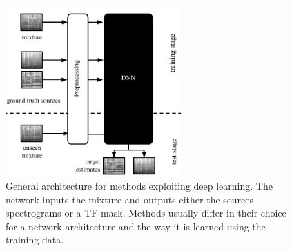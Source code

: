 {{\begin{figure}
  \centering
  \includegraphics[width=0.6\textwidth]{Chapters/06_Separation_Unknown/figures/methods_dnn.pdf}
  \caption{General architecture for methods exploiting deep learning. The network inputs the mixture and outputs either the sources spectrograms or a TF mask. Methods usually differ in their choice for a network architecture and the way it is learned using the training data.}
  \label{fig:methods_dnn}
\end{figure}

}}

